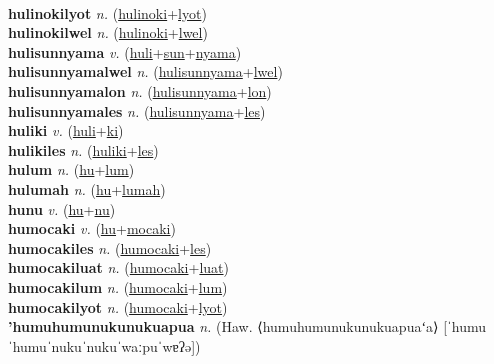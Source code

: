  \label{hulinokilon} \\
\textbf{hulinokilyot} \textit{n.} (\hyperref[hulinoki]{hulinoki}+\hyperref[lyot]{lyot})
 \label{hulinokilyot} \\
\textbf{hulinokilwel} \textit{n.} (\hyperref[hulinoki]{hulinoki}+\hyperref[lwel]{lwel})
 \label{hulinokilwel} \\
\textbf{hulisunnyama} \textit{v.} (\hyperref[huli]{huli}+\hyperref[sun]{sun}+\hyperref[nyama]{nyama})
 \label{hulisunnyama} \\
\textbf{hulisunnyamalwel} \textit{n.} (\hyperref[hulisunnyama]{hulisunnyama}+\hyperref[lwel]{lwel})
 \label{hulisunnyamalwel} \\
\textbf{hulisunnyamalon} \textit{n.} (\hyperref[hulisunnyama]{hulisunnyama}+\hyperref[lon]{lon})
 \label{hulisunnyamalon} \\
\textbf{hulisunnyamales} \textit{n.} (\hyperref[hulisunnyama]{hulisunnyama}+\hyperref[les]{les})
 \label{hulisunnyamales} \\
\textbf{huliki} \textit{v.} (\hyperref[huli]{huli}+\hyperref[ki]{ki})
 \label{huliki} \\
\textbf{hulikiles} \textit{n.} (\hyperref[huliki]{huliki}+\hyperref[les]{les})
 \label{hulikiles} \\
\textbf{hulum} \textit{n.} (\hyperref[hu]{hu}+\hyperref[lum]{lum})
 \label{hulum} \\
\textbf{hulumah} \textit{n.} (\hyperref[hu]{hu}+\hyperref[lumah]{lumah})
 \label{hulumah} \\
\textbf{hunu} \textit{v.} (\hyperref[hu]{hu}+\hyperref[nu]{nu})
 \label{hunu} \\
\textbf{humocaki} \textit{v.} (\hyperref[hu]{hu}+\hyperref[mocaki]{mocaki})
 \label{humocaki} \\
\textbf{humocakiles} \textit{n.} (\hyperref[humocaki]{humocaki}+\hyperref[les]{les})
 \label{humocakiles} \\
\textbf{humocakiluat} \textit{n.} (\hyperref[humocaki]{humocaki}+\hyperref[luat]{luat})
 \label{humocakiluat} \\
\textbf{humocakilum} \textit{n.} (\hyperref[humocaki]{humocaki}+\hyperref[lum]{lum})
 \label{humocakilum} \\
\textbf{humocakilyot} \textit{n.} (\hyperref[humocaki]{humocaki}+\hyperref[lyot]{lyot})
 \label{humocakilyot} \\
\textbf{'humuhumunukunukuapua} \textit{n.} (Haw. ⟨humuhumunukunukuapuaʻa⟩ [ˈhumuˈhumuˈnukuˈnukuˈwaːpuˈwɐʔə])
 \label{'humuhumunukunukuapua} \\
